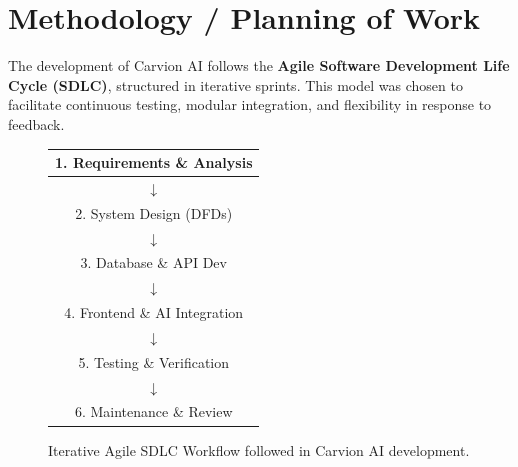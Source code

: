 \documentclass[12pt,a4paper]{article}
\begin{document}
\clearpage

\section{Methodology / Planning of Work}

The development of Carvion AI follows the \textbf{Agile Software Development Life Cycle (SDLC)}, structured in iterative sprints. This model was chosen to facilitate continuous testing, modular integration, and flexibility in response to feedback.

\begin{figure}[h]
\centering
\begin{tabular}{|c|}
\hline
1. Requirements \& Analysis \\
\hline
$\downarrow$ \\
\hline
2. System Design (DFDs) \\
\hline
$\downarrow$ \\
\hline
3. Database \& API Dev \\
\hline
$\downarrow$ \\
\hline
4. Frontend \& AI Integration \\
\hline
$\downarrow$ \\
\hline
5. Testing \& Verification \\
\hline
$\downarrow$ \\
\hline
6. Maintenance \& Review \\
\hline
\end{tabular}
\caption{Iterative Agile SDLC Workflow followed in Carvion AI development.}
\label{fig:sdlc_workflow}
\end{figure}
\end{document}
